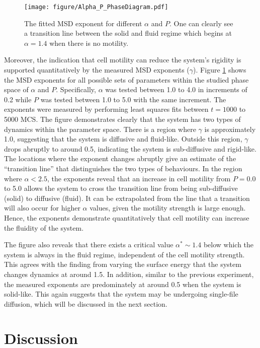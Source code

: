 \documentclass[a4paper,12pt]{article}
\begin{document}
\begin{figure}[h]
\centering
\texttt{[image: figure/Alpha\_P\_PhaseDiagram.pdf]}
\caption{The fitted MSD exponent for different $\alpha$ and $P$. One can clearly see a transition line between the solid and fluid regime which begins at $\alpha = 1.4$ when there is no motility.}
\label{fig:diffexpalphap}
\end{figure}
\FloatBarrier

Moreover, the indication that cell motility can reduce the system's rigidity is supported quantitatively by the measured MSD exponents ($\gamma$). Figure \ref{fig:diffexpalphap} shows the MSD exponents for all possible sets of parameters within the studied phase space of $\alpha$ and $P$. Specifically, $\alpha$ was tested between 1.0 to 4.0 in increments of 0.2 while $P$ was tested between 1.0 to 5.0 with the same increment. The exponents were measured by performing least squares fits between $t = 1000$ to 5000 MCS. The figure demonstrates clearly that the system has two types of dynamics within the parameter space. There is a region where $\gamma$ is approximately 1.0, suggesting that the system is diffusive and fluid-like. Outside this region, $\gamma$ drops abruptly to around 0.5, indicating the system is sub-diffusive and rigid-like. The locations where the exponent changes abruptly give an estimate of the ``transition line'' that distinguishes the two types of behaviours. In the region where $\alpha < 2.5$, the exponents reveal that an increase in cell motility from $P = 0.0$ to 5.0 allows the system to cross the transition line from being sub-diffusive (solid) to diffusive (fluid). It can be extrapolated from the line that a transition will also occur for higher $\alpha$ values, given the motility strength is large enough. Hence, the exponents demonstrate quantitatively that cell motility can increase the fluidity of the system. 

The figure also reveals that there exists a critical value $\alpha^* \sim 1.4$ below which the system is always in the fluid regime, independent of the cell motility strength. This agrees with the finding from varying the surface energy that the system changes dynamics at around 1.5. In addition, similar to the previous experiment, the measured exponents are predominately at around 0.5 when the system is solid-like. This again suggests that the system may be undergoing single-file diffusion, which will be discussed in the next section.



\section{Discussion}
\end{document}
